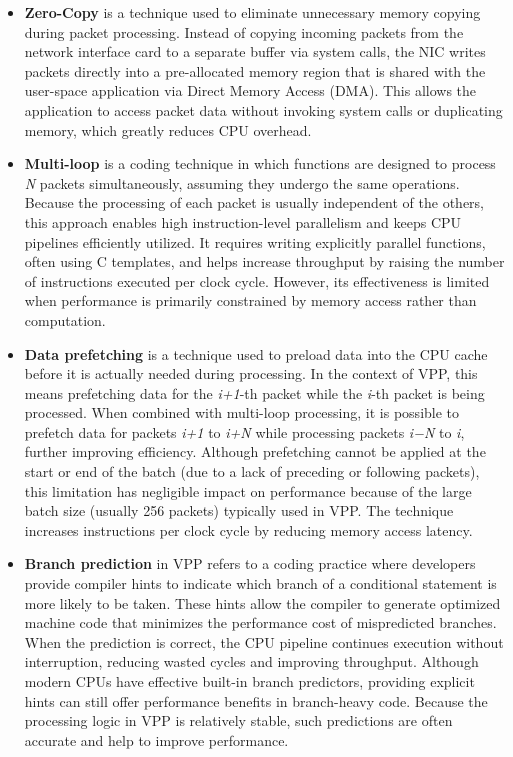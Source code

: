 \begin{itemize}
  \item \textbf{Zero-Copy} 
is a technique used to eliminate unnecessary memory copying during packet processing. 
Instead of copying incoming packets from the network interface card to a separate buffer via system calls, 
the NIC writes packets directly into a pre-allocated memory region that is shared with the user-space application via Direct Memory Access (DMA). 
This allows the application to access packet data without invoking system calls or duplicating memory, which greatly reduces CPU overhead.~\cite{LINGUAGLOSSA}
 
  \item \textbf{Multi-loop} is a coding technique in which functions are designed to process \textit{N} packets simultaneously, assuming they undergo the same operations. 
Because the processing of each packet is usually independent of the others, this approach enables high instruction-level parallelism and keeps CPU pipelines efficiently utilized. 
It requires writing explicitly parallel functions, often using C templates, and helps increase throughput by raising the number of instructions executed per clock cycle. 
However, its effectiveness is limited when performance is primarily constrained by memory access rather than computation.~\cite{LINGUAGLOSSA}

  \item \textbf{Data prefetching} is a technique used to preload data into the CPU cache before it is actually needed during processing. 
In the context of VPP, this means prefetching data for the \textit{i+1}-th packet while the \textit{i}-th packet is being processed.
When combined with multi-loop processing, it is possible to prefetch data for packets \textit{i+1} to \textit{i+N} while processing packets \textit{i−N} to \textit{i}, further improving efficiency.
Although prefetching cannot be applied at the start or end of the batch (due to a lack of preceding or following packets), 
this limitation has negligible impact on performance because of the large batch size (usually 256 packets) typically used in VPP.
The technique increases instructions per clock cycle by reducing memory access latency.~\cite{LINGUAGLOSSA}

 \item \textbf{Branch prediction} in VPP refers to a coding practice where developers provide compiler hints to indicate which branch of a conditional statement is more likely to be taken.
These hints allow the compiler to generate optimized machine code that minimizes the performance cost of mispredicted branches.
When the prediction is correct, the CPU pipeline continues execution without interruption, reducing wasted cycles and improving throughput.
Although modern CPUs have effective built-in branch predictors, providing explicit hints can still offer performance benefits in branch-heavy code.
Because the processing logic in VPP is relatively stable, such predictions are often accurate and help to improve performance.~\cite{LINGUAGLOSSA}
 

\end{itemize}

